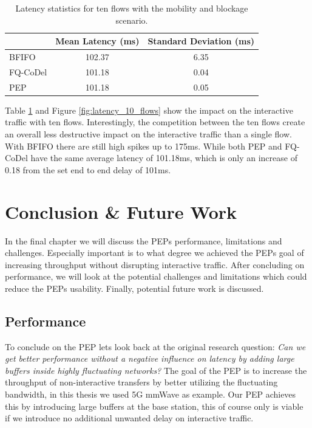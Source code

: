 \documentclass[a4paper,english, 11pt]{report}
\begin{document}
\begin{table}[h!]
\centering
\begin{tabular}{l|c|c}
\hline
 & \textbf{Mean Latency (ms)} & \textbf{Standard Deviation (ms)} \\
\hline
BFIFO   & 102.37 & 6.35 \\
FQ-CoDel  &  101.18 & 0.04 \\
PEP  &  101.18 & 0.05 \\
\end{tabular}
\caption{Latency statistics for ten flows with the mobility and blockage scenario.}
\label{tab:latency_10_flows}
\end{table}

Table \ref{tab:latency_10_flows} and Figure \ref{fig:latency_10_flows} show the impact on the interactive traffic with ten flows. Interestingly, the competition between the ten flows create an overall less destructive impact on the interactive traffic than a single flow. With BFIFO there are still high spikes up to 175ms. While both PEP and FQ-CoDel have the same average latency of 101.18ms, which is only an increase of 0.18 from the set end to end delay of 101ms.\\

\chapter{Conclusion \& Future Work}
In the final chapter we will discuss the PEPs performance, limitations and challenges. Especially important is to what degree we achieved the PEPs goal of increasing throughput without disrupting interactive traffic. After concluding on performance, we will look at the potential challenges and limitations which could reduce the PEPs usability. Finally, potential future work is discussed.\\

\section{Performance}
To conclude on the PEP lets look back at the original research question: \textit{Can we get better performance without a negative influence on latency by adding large buffers inside highly fluctuating networks?} The goal of the PEP is to increase the throughput of non-interactive transfers by better utilizing the fluctuating bandwidth, in this thesis we used 5G mmWave as example. Our PEP achieves this by introducing large buffers at the base station, this of course only is viable if we introduce no additional unwanted delay on interactive traffic.\\
\end{document}
